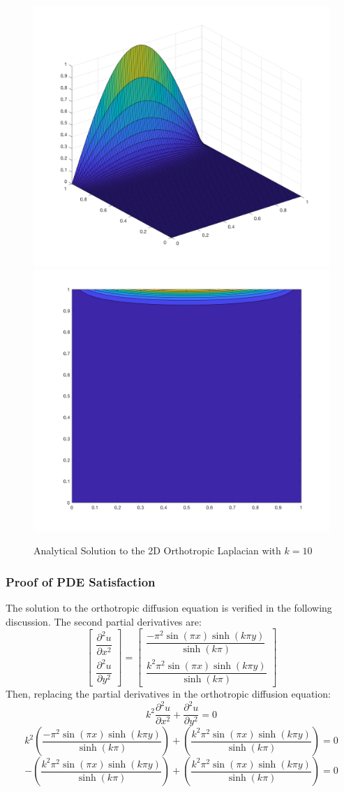 \documentclass[10pt]{article}		%
\numberwithin{equation}{section}
\newcommand{\psder}[2]{\dfrac{\partial^2#1}{\partial#2^2}}		%
\begin{document}
\begin{figure}[H]
	\begin{center}
		\includegraphics[width = 0.39\linewidth]{analytical_surface_k_10}
		\includegraphics[width = 0.39\linewidth]{analytical_contour_k_10}
		\caption{Analytical Solution to the 2D Orthotropic Laplacian with $k = 10$}
	\end{center}
\end{figure}

\subsubsection{Proof of PDE Satisfaction}

The solution to the orthotropic diffusion equation is verified in the following discussion. The second partial derivatives are:
\begin{equation}
\begin{bmatrix}
\psder{u}{x} \\[12pt] \psder{u}{y}
\end{bmatrix} = \begin{bmatrix}
\dfrac{-\pi^2 \sin(\pi x) \sinh(k\pi y)}{\sinh(k\pi)} \\[12pt] \dfrac{k^2\pi^2\sin(\pi x) \sinh(k \pi y)}{\sinh(k\pi)}
\end{bmatrix}
\end{equation}
Then, replacing the partial derivatives in the orthotropic diffusion equation:
\begin{equation}
k^2\psder{u}{x} + \psder{u}{y} = 0
\end{equation}
\begin{equation}
k^2\left(\dfrac{-\pi^2 \sin(\pi x) \sinh(k\pi y)}{\sinh(k\pi)}\right) + \left(\dfrac{k^2\pi^2\sin(\pi x) \sinh(k \pi y)}{\sinh(k\pi)}\right) = 0 
\end{equation}
\begin{equation}
-\left(\dfrac{k^2\pi^2 \sin(\pi x) \sinh(k\pi y)}{\sinh(k\pi)}\right) + \left(\dfrac{k^2\pi^2\sin(\pi x) \sinh(k \pi y)}{\sinh(k\pi)}\right) = 0 
\end{equation}
\end{document}
